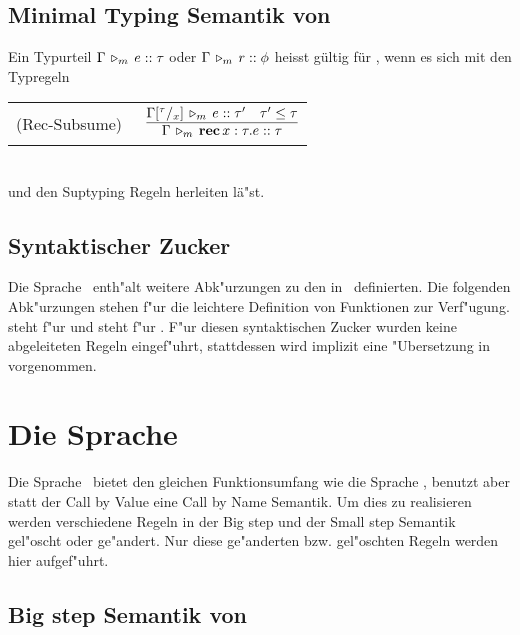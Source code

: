 \subsection{Minimal Typing Semantik von \LTWO}

  Ein Typurteil $\Gamma\,\triangleright_m\,e\mathrel{::}\tau$ oder $\Gamma\,\triangleright_m\,r\mathrel{::}\phi$ heisst g\"ultig f\"ur \Lom,
  wenn es sich mit den Typregeln \\[5mm]
  \begin{tabular}{ll} 
    \mbox{(Rec-Subsume)\ }  & $\RULE{\Tjm{\Gamma\SUB{\tau}{x}}{e}{\tau'} \quad \tau' \le \tau}
                              {\Tjm{\Gamma}{\expRec{x:\tau}{e}}{\tau}}$ \\[4mm]
  \end{tabular} \\[7mm]
  und den Suptyping Regeln herleiten l\"a"st.


\subsection{Syntaktischer Zucker}

Die Sprache \LTWO\ enth"alt weitere Abk"urzungen zu den in \LONE\ definierten. Die folgenden Abk"urzungen stehen f"ur
die leichtere Definition von Funktionen zur Verf"ugung.
\beqns
\eeqns
steht f"ur
\beqns
\eeqns
und
\beqns
\eeqns
steht f"ur
\beqns
  \mbox{.}
\eeqns
F"ur diesen syntaktischen Zucker wurden keine abgeleiteten Regeln eingef"uhrt, stattdessen wird implizit
eine "Ubersetzung in  vorgenommen.



\section{Die Sprache \LTWOCBN}

Die Sprache \LTWOCBN \ bietet den gleichen Funktionsumfang wie die Sprache \LTWO, benutzt aber statt der 
Call by Value eine Call by Name Semantik. Um dies zu realisieren werden verschiedene Regeln in der Big step 
und der Small step Semantik gel"oscht oder ge"andert. Nur diese ge"anderten bzw. gel"oschten Regeln werden hier
aufgef"uhrt.

\subsection{Big step Semantik von \LTWOCBN}

